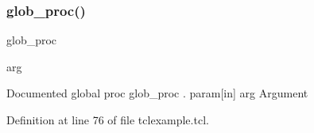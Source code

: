 \subsubsection{\texorpdfstring{glob\+\_\+proc()}{glob\_proc()}}
{\footnotesize\ttfamily glob\+\_\+proc\begin{DoxyParamCaption}\item[{}]{arg  }\end{DoxyParamCaption}}

Documented global proc {\ttfamily glob\+\_\+proc} . param\mbox{[}in\mbox{]} arg Argument 

Definition at line 76 of file tclexample.\+tcl.

